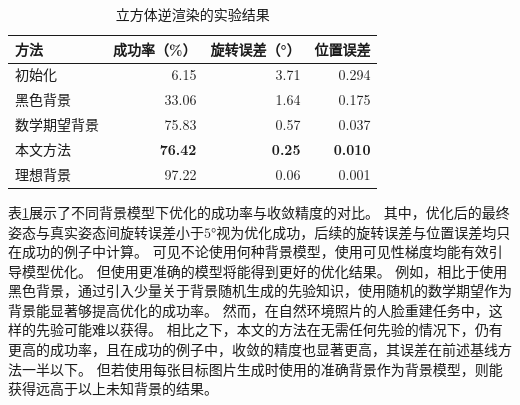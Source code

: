 \begin{table}
    \centering
    \caption{立方体逆渲染的实验结果}
    \label{tab:cube_opt}
    \begin{tabular}{l|rrr}
        \toprule
        方法       & 成功率（\%） & 旋转误差（°） & 位置误差 \\
        \midrule
        初始化      &  6.15 & 3.71 & 0.294 \\
        黑色背景    & 33.06 & 1.64 & 0.175 \\
        数学期望背景& 75.83 & 0.57 & 0.037 \\
        本文方法    & \textbf{76.42} & \textbf{0.25} & \textbf{0.010} \\
        \midrule
        理想背景    & 97.22 & 0.06 & 0.001 \\
        \bottomrule
    \end{tabular}
\end{table}
表\ref{tab:cube_opt}展示了不同背景模型下优化的成功率与收敛精度的对比。
其中，优化后的最终姿态与真实姿态间旋转误差小于$5°$视为优化成功，后续的旋转误差与位置误差均只在成功的例子中计算。
可见不论使用何种背景模型，使用可见性梯度均能有效引导模型优化。
但使用更准确的模型将能得到更好的优化结果。
例如，相比于使用黑色背景，通过引入少量关于背景随机生成的先验知识，使用随机的数学期望作为背景能显著够提高优化的成功率。
然而，在自然环境照片的人脸重建任务中，这样的先验可能难以获得。
相比之下，本文的方法在无需任何先验的情况下，仍有更高的成功率，且在成功的例子中，收敛的精度也显著更高，其误差在前述基线方法一半以下。
但若使用每张目标图片生成时使用的准确背景作为背景模型，则能获得远高于以上未知背景的结果。

